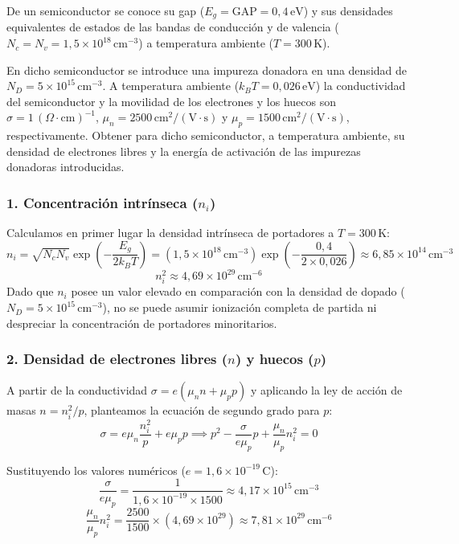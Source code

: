\begin{problema}
De un semiconductor se conoce su gap ($E_g = \text{GAP} = 0,4\,\text{eV}$) y sus densidades equivalentes de estados de las bandas de conducción y de valencia ($N_c = N_v = 1,5 \times 10^{18}\,\text{cm}^{-3}$) a temperatura ambiente ($T = 300\,\text{K}$).

En dicho semiconductor se introduce una impureza donadora en una densidad de $N_D = 5 \times 10^{15}\,\text{cm}^{-3}$. A temperatura ambiente ($k_B T = 0,026\,\text{eV}$) la conductividad del semiconductor y la movilidad de los electrones y los huecos son $\sigma = 1\,(\Omega\cdot\text{cm})^{-1}$, $\mu_n = 2500\,\text{cm}^2/(\text{V}\cdot\text{s})$ y $\mu_p = 1500\,\text{cm}^2/(\text{V}\cdot\text{s})$, respectivamente. Obtener para dicho semiconductor, a temperatura ambiente, su densidad de electrones libres y la energía de activación de las impurezas donadoras introducidas.
\tcblower
\subsubsection*{1. Concentración intrínseca ($n_i$)}
Calculamos en primer lugar la densidad intrínseca de portadores a $T = 300\,\text{K}$:
\[
n_i = \sqrt{N_c N_v} \exp\left(-\frac{E_g}{2 k_B T}\right) = (1,5 \times 10^{18}\,\text{cm}^{-3}) \exp\left(-\frac{0,4}{2 \times 0,026}\right) \approx 6,85 \times 10^{14}\,\text{cm}^{-3}
\]
\[
n_i^2 \approx 4,69 \times 10^{29}\,\text{cm}^{-6}
\]
Dado que $n_i$ posee un valor elevado en comparación con la densidad de dopado ($N_D = 5 \times 10^{15}\,\text{cm}^{-3}$), no se puede asumir ionización completa de partida ni despreciar la concentración de portadores minoritarios.

\subsubsection*{2. Densidad de electrones libres ($n$) y huecos ($p$)}
A partir de la conductividad $\sigma = e (\mu_n n + \mu_p p)$ y aplicando la ley de acción de masas $n = n_i^2 / p$, planteamos la ecuación de segundo grado para $p$:
\[
\sigma = e \mu_n \frac{n_i^2}{p} + e \mu_p p \implies p^2 - \frac{\sigma}{e \mu_p} p + \frac{\mu_n}{\mu_p} n_i^2 = 0
\]

Sustituyendo los valores numéricos ($e = 1,6 \times 10^{-19}\,\text{C}$):
\[
\frac{\sigma}{e \mu_p} = \frac{1}{1,6 \times 10^{-19} \times 1500} \approx 4,17 \times 10^{15}\,\text{cm}^{-3}
\]
\[
\frac{\mu_n}{\mu_p} n_i^2 = \frac{2500}{1500} \times (4,69 \times 10^{29}) \approx 7,81 \times 10^{29}\,\text{cm}^{-6}
\]


\end{problema}

